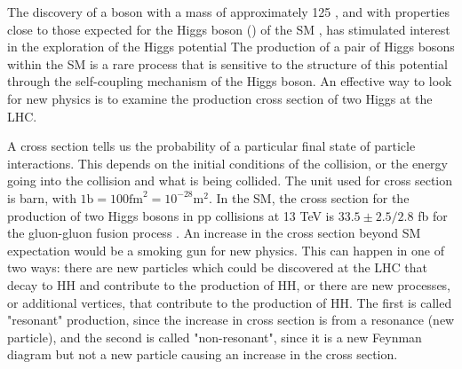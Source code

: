 \ifdefined{}\fi

The discovery of a boson with a mass of approximately 125 \GeV, and with properties close to those expected for the 
Higgs boson (\PH) of the SM \cite{Chatrchyan:2012ufa,HiggsdiscoveryAtlas}, has stimulated 
interest in the exploration of the Higgs potential\ifdefined{}\fi 
The production of a pair of Higgs bosons within 
the SM is a rare process that is sensitive to the structure of this potential through the self-coupling mechanism of the Higgs boson.
An effective way to look for new physics is to examine the production cross section of two Higgs at the LHC.

A cross section tells us the probability of a particular final state of particle interactions. This depends on the initial conditions of the collision,  or the energy going into the collision and what is being collided. The unit used for cross section is barn, with $1 \text{b} = 100 \text{fm}^2 = 10^{-28} \text{m}^2$. In the SM, the cross section for the production of two Higgs bosons in pp collisions at 13 TeV is $33.5 \pm 2.5/2.8$ fb
for the gluon-gluon fusion process \cite{deFlorian:2016spz,deFlorian:2013jea,Baglio:2012np}.
An increase in the cross section beyond SM expectation would be a smoking gun for new physics. This can happen in one of two ways: there are new particles which could be discovered at the LHC that decay to HH and contribute to the production of HH, or there are new processes, or additional vertices, that contribute to the production of HH. The first is called "resonant" production, since the increase in cross section is from a resonance (new particle), and the second is called "non-resonant", since it is a new Feynman diagram but not a new particle causing an increase in the cross section. %

